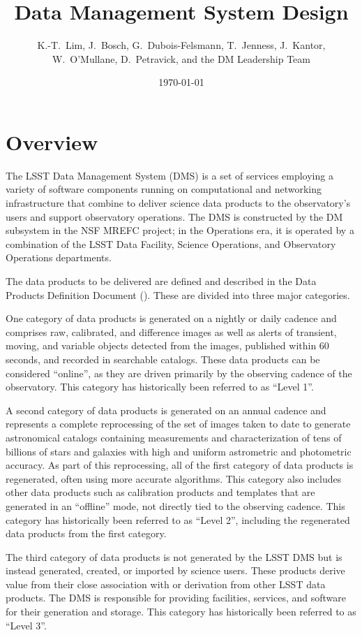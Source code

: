 \documentclass[DM,lsstdraft,toc]{lsstdoc}
\title{Data Management System Design}
\author{
  K.-T.~Lim,
  J.~Bosch,
  G.~Dubois-Felsmann,
  T.~Jenness,
  J.~Kantor,
  W.~O'Mullane,
  D.~Petravick,
  and
  the DM Leadership Team}
\date{\today}
\begin{document}
\maketitle

\section{Overview}\label{overview}

The LSST Data Management System (DMS) is a set of services employing a
variety of software components running on computational and networking
infrastructure that combine to deliver science data products to the
observatory's users and support observatory operations. The DMS is
constructed by the DM subsystem in the NSF MREFC project; in the
Operations era, it is operated by a combination of the LSST Data
Facility, Science Operations, and Observatory Operations departments.

The data products to be delivered are defined and described in the Data
Products Definition Document (). These are divided into three
major categories.

One category of data products is generated on a nightly or daily cadence
and comprises raw, calibrated, and difference images as well as alerts
of transient, moving, and variable objects detected from the images,
published within 60 seconds, and recorded in searchable catalogs. These
data products can be considered ``online'', as they are driven primarily
by the observing cadence of the observatory. This category has
historically been referred to as ``Level 1''.

A second category of data products is generated on an annual cadence and
represents a complete reprocessing of the set of images taken to date to
generate astronomical catalogs containing measurements and
characterization of tens of billions of stars and galaxies with high and
uniform astrometric and photometric accuracy. As part of this
reprocessing, all of the first category of data products is regenerated,
often using more accurate algorithms. This category also includes other
data products such as calibration products and templates that are
generated in an ``offline'' mode, not directly tied to the observing
cadence. This category has historically been referred to as ``Level 2'',
including the regenerated data products from the first category.

The third category of data products is not generated by the LSST DMS but
is instead generated, created, or imported by science users. These
products derive value from their close association with or derivation
from other LSST data products. The DMS is responsible for providing
facilities, services, and software for their generation and storage.
This category has historically been referred to as ``Level 3''.
\end{document}
